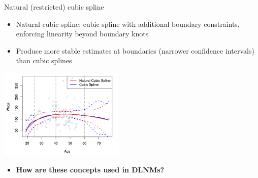 \documentclass[english]{beamer}
\newcommand{\alertblue}[1]{{\color{blue}#1}}
\begin{document}
\begin{frame}{Natural (restricted) cubic spline}
    \begin{itemize}
        \item \alertblue{Natural cubic spline}: cubic spline with \alertblue{additional boundary constraints, enforcing linearity beyond boundary knots} 
        \item Produce more \alertblue{stable estimates at boundaries (narrower confidence intervals)} than cubic splines
    \end{itemize}
    \centering
    \includegraphics[width=6cm]{images/cubic_vs_natural.png}
    \begin{itemize}
        \item \textbf{\alertblue{How are these concepts used in DLNMs?}}
    \end{itemize}
\end{frame}
\end{document}
